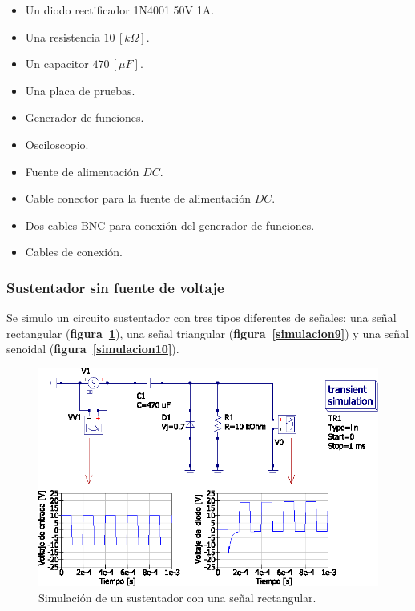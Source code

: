 \documentclass[letter,twoside,11pt]{article}
\begin{document}
\begin{itemize}
    \item Un diodo rectificador 1N4001 50V 1A.
    \item Una resistencia $10\,[k\Omega]$.
    \item Un capacitor $470\,[\mu F]$.
    \item Una placa de pruebas.
    \item Generador de funciones.
    \item Osciloscopio.
    \item Fuente de alimentación $DC$.
    \item Cable conector para la fuente de alimentación $DC$.
    \item Dos cables BNC para conexión del generador de funciones.
    \item Cables de conexión.
\end{itemize}

\subsubsection{Sustentador sin fuente de voltaje}
Se simulo un circuito sustentador con tres tipos diferentes de señales: una
señal rectangular (\textbf{figura~\ref{simulacion8}}), una señal triangular
(\textbf{figura~\ref{simulacion9}}) y una señal senoidal
(\textbf{figura~\ref{simulacion10}}).

\begin{figure}[!h]
\centering
\includegraphics[scale=0.97]{simulacion/practica1.8.eps}
\caption{Simulación de un sustentador con una señal rectangular.}
\label{simulacion8}
\end{figure}
\end{document}
